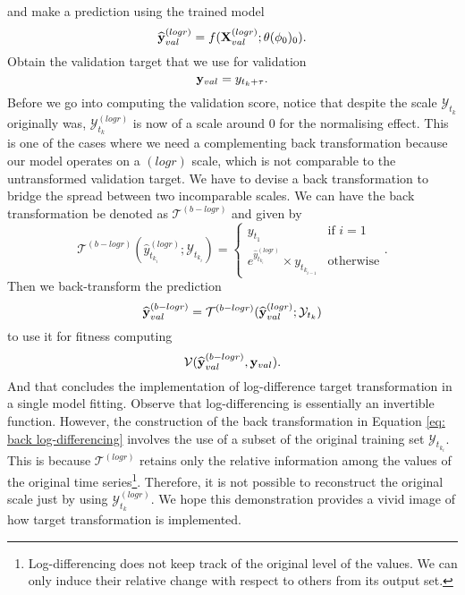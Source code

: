 and make a prediction using the trained model
\begin{equation*}
    \widehat{\mathbf{y}}^{(logr)}_{val} = f(\mathbf{X}^{(logr)}_{val} ; \theta(\phi_0)_0).
\end{equation*}
Obtain the validation target that we use for validation
\begin{equation*}
    \mathbf{y}_{val} = y_{t_k + \tau}.
\end{equation*}
Before we go into computing the validation score, notice that despite the scale $\mathcal{Y}_{t_k}$ originally was, $\mathcal{Y}^{(logr)}_{t_k}$ is now of a scale around $0$ for the normalising effect. This is one of the cases where we need a complementing back transformation because our model operates on a $(logr)$ scale, which is not comparable to the untransformed validation target. We have to devise a back transformation to bridge the spread between two incomparable scales. We can have the back transformation be denoted as $\mathcal{T}^{(b-logr)}$ and given by
\begin{equation}\label{eq: back log-differencing}
    \mathcal{T}^{(b-logr)}(\widehat{y}^{(logr)}_{t_{k_i}} ;\mathcal{Y}_{t_{k_i}}) =
    \begin{cases}
        y_{t_1}                                                   &\text{if $i = 1$} \\
        e^{\widehat{y}^{(logr)}_{t_{k_i}}} \times y_{t_{k_{i-1}}} &\text{otherwise}
    \end{cases}.
\end{equation}
Then we back-transform the prediction
\begin{equation*}
    \widehat{\mathbf{y}}^{(b-logr)}_{val} = \mathcal{T}^{(b-logr)}(\widehat{\mathbf{y}}^{(logr)}_{val} ;\mathcal{Y}_{t_k})
\end{equation*}
to use it for fitness computing
\begin{equation*}
    \mathcal{V}(\widehat{\mathbf{y}}^{(b-logr)}_{val}, \mathbf{y}_{val}).
\end{equation*}
And that concludes the implementation of log-difference target transformation in a single model fitting. Observe that log-differencing is essentially an invertible function. However, the construction of the back transformation in Equation \ref{eq: back log-differencing} involves the use of a subset of the original training set $\mathcal{Y}_{t_{k_i}}$. This is because $\mathcal{T}^{(logr)}$ retains only the relative information among the values of the original time series\footnote{Log-differencing does not keep track of the original level of the values. We can only induce their relative change with respect to others from its output set.}. Therefore, it is not possible to reconstruct the original scale just by using $\mathcal{Y}^{(logr)}_{t_k}$. We hope this demonstration provides a vivid image of how target transformation is implemented.

